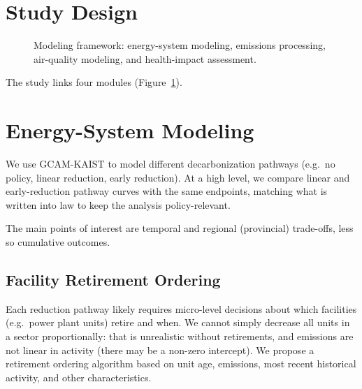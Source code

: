 
\section{Study Design}\label{sec:design}

\begin{figure}[htbp]
  \centering
  \caption{Modeling framework: energy-system modeling, emissions processing,
    air-quality modeling, and health-impact assessment.}
  \label{fig:pipeline}
\end{figure}

The study links four modules (Figure~\ref{fig:pipeline}).

\section{Energy-System Modeling}\label{sec:energy}

We use GCAM-KAIST to model different decarbonization pathways (e.g.\ no
policy, linear reduction, early reduction). At a high level, we compare linear
and early-reduction pathway curves with the same endpoints, matching what is
written into law to keep the analysis policy-relevant.

The main points of interest are temporal and regional (provincial) trade-offs,
less so cumulative outcomes.


\subsection{Facility Retirement Ordering}\label{sec:retirement}

Each reduction pathway likely requires micro-level decisions about which
facilities (e.g.\ power plant units) retire and when. We cannot simply
decrease all units in a sector proportionally: that is unrealistic without
retirements, and emissions are not linear in activity (there may be a
non-zero intercept). We propose a retirement ordering algorithm based on
unit age, emissions, most recent historical activity, and other
characteristics.

